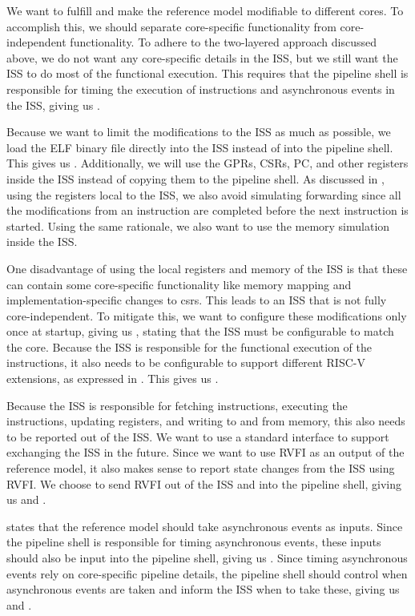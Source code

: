 We want to fulfill  and make the reference model modifiable to different cores. To accomplish this, we should separate core-specific functionality from core-independent functionality. To adhere to the two-layered approach discussed above, we do not want any core-specific details in the ISS, but we still want the ISS to do most of the functional execution. This requires that the pipeline shell is responsible for timing the execution of instructions and asynchronous events in the ISS, giving us \textbf{}. 

Because we want to limit the modifications to the ISS as much as possible, we load the ELF binary file directly into the ISS instead of into the pipeline shell. This gives us \textbf{}. Additionally, we will use the GPRs, CSRs, PC, and other registers inside the ISS instead of copying them to the pipeline shell. As discussed in , using the registers local to the ISS, we also avoid simulating forwarding since all the modifications from an instruction are completed before the next instruction is started. Using the same rationale, we also want to use the memory simulation inside the ISS.

One disadvantage of using the local registers and memory of the ISS is that these can contain some core-specific functionality like memory mapping and imple\-mentation-specific changes to \acrshort{csr}s. This leads to an ISS that is not fully core-independent. To mitigate this, we want to configure these modifications only once at startup, giving us  \textbf{}, stating that the ISS must be configurable to match the core. Because the ISS is responsible for the functional execution of the instructions, it also needs to be configurable to support different RISC-V extensions, as expressed in \textbf{}. This gives us \textbf{}. 

Because the ISS is responsible for fetching instructions, executing the instructions, updating registers, and writing to and from memory, this also needs to be reported out of the ISS. We want to use a standard interface to support exchanging the ISS in the future. Since we want to use RVFI as an output of the reference model, it also makes sense to report state changes from the ISS using RVFI. We choose to send RVFI out of the ISS and into the pipeline shell, giving us \textbf{} and \textbf{}.

 states that the reference model should take asynchronous events as inputs. Since the pipeline shell is responsible for timing asynchronous events, these inputs should also be input into the pipeline shell, giving us \textbf{}. Since timing asynchronous events rely on core-specific pipeline details, the pipeline shell should control when asynchronous events are taken and inform the ISS when to take these, giving us \textbf{} and \textbf{}.

